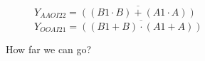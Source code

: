 \documentclass[aspectratio=169]{beamer}
\begin{document}
\begin{frame}
    \begin{figure}[h]
        \begin{center}
            \begin{circuitdiagram}{18}{12}
                \usgate
            \end{circuitdiagram}
            \hspace{2cm}
            \begin{circuitdiagram}{18}{12}
                \usgate
            \end{circuitdiagram}
        \end{center}
    $Y_{AAOI22} = \overline{ ((B1 \cdot B) + (A1 \cdot A)) }$
    \hspace{2cm}
    $Y_{OOAI21} = \overline{ ((B1 + B) \cdot (A1 + A)) }$
    \end{figure}
How far we can go?
\end{frame}

\end{document}
